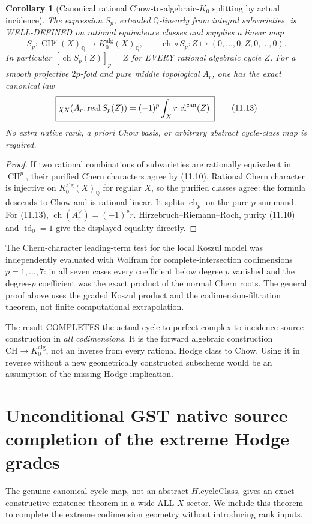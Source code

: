 \documentclass[11pt]{article}
\newcommand{\Q}{\mathbb Q}
\newcommand{\CH}{\operatorname{CH}}
\newcommand{\ch}{\operatorname{ch}}
\newcommand{\td}{\operatorname{td}}
\newcommand{\cl}{\operatorname{cl}}
\newtheorem{corollary}[theorem]{Corollary}
\begin{document}
\begin{corollary}[Canonical rational Chow-to-algebraic-\(K_0\) splitting by actual incidence]
The expression \(S_p\), extended \(\Q\)-linearly
from integral subvarieties, is WELL-DEFINED
on rational equivalence classes and supplies a
linear map
\[
 \boxed{
 S_p:\CH^p(X)_\Q\longrightarrow
                 K_0^{\mathrm{alg}}(X)_\Q,
 \qquad \ch\circ S_p:
 Z\longmapsto(0,\ldots,0,Z,0,\ldots,0).}           \tag{11.12}
\]
In particular \([\ch S_p(Z)]_p=Z\) for
EVERY rational algebraic cycle \(Z\).
For a smooth projective \(2p\)-fold and pure middle
topological \(A_r\), one has the exact canonical law
\[
 \boxed{
 \chi_X(A_r,\operatorname{real}S_p(Z))
   =(-1)^p\int_X r\,\cl^{\rm can}(Z).
 }                                                       \tag{11.13}
\]
No extra native rank, a priori Chow basis,
or arbitrary abstract cycle-class map is required.
\end{corollary}
\begin{proof}
If two rational combinations of subvarieties
are rationally equivalent in \(\CH^p\),
their purified Chern characters agree
by (11.10). Rational Chern character is
injective on \(K_0^{\mathrm{alg}}(X)_\Q\)
for regular \(X\), so the purified classes
agree: the formula descends to Chow and
is rational-linear. It splits
\(\ch_p\) on the pure-\(p\) summand.
For (11.13), \(\ch(A_r^\vee)=(-1)^p r\).
Hirzebruch--Riemann--Roch, purity
(11.10) and \(\td_0=1\) give the
displayed equality directly.
\end{proof}

The Chern-character leading-term test for the
local Koszul model was independently evaluated
with Wolfram for complete-intersection
codimensions \(p=1,\ldots,7\):
in all seven cases every coefficient below
degree \(p\) vanished and the degree-\(p\)
coefficient was the exact product of the
normal Chern roots. The general proof
above uses the graded Koszul product and
the codimension-filtration theorem, not
finite computational extrapolation.

The result COMPLETES the actual cycle-to-perfect-complex
to incidence-source construction in \emph{all codimensions}.
It is the forward algebraic construction
\(\mathrm{CH}\to K_0^{\mathrm{alg}}\),
not an inverse from every rational Hodge
class to Chow. Using it in reverse without
a new geometrically constructed subscheme
would be an assumption of the missing Hodge implication.

\section{Unconditional GST native source completion of the extreme Hodge grades}
The genuine canonical cycle map, not an abstract
\(H.\mathrm{cycleClass}\), gives an exact constructive
existence theorem in a wide ALL-\(X\) sector.
We include this theorem to complete the extreme
codimension geometry without introducing rank inputs.
\end{document}

